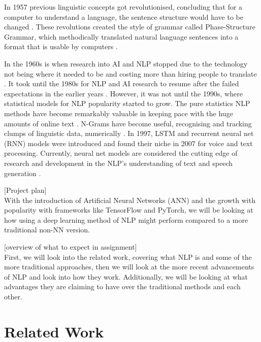 \documentclass[a4paper,10pt]{article}
\begin{document}
	In 1957 previous linguistic concepts got revolutionised, concluding that for a computer to understand a language, the sentence structure would have to be changed \cite{chomsky2002syntactic}. These revolutions created the style of grammar called Phase-Structure Grammar, which methodically translated natural language sentences into a format that is usable by computers \cite{nlp_history}. 
	
	In the 1960s is when research into AI and NLP stopped due to the technology not being where it needed to be and costing more than hiring people to translate \cite{nlp_history}. It took until the 1980s for NLP and AI \cite{what_ai} research to resume after the failed expectations in the earlier years \cite{nlp_history}. However, it was not until the 1990s, where statistical models for NLP popularity started to grow. The pure statistics NLP methods have become remarkably valuable in keeping pace with the huge amounts of online text \cite{nlp_history}. N-Grams have become useful, recognising and tracking clumps of linguistic data, numerically \cite{n_grams}. In 1997, LSTM and recurrent neural net (RNN) models \cite{nlp_rnn} were introduced and found their niche in 2007 for voice and text processing. Currently, neural net models are considered the cutting edge of research and development in the NLP's understanding of text and speech generation \cite{nlp_history}.
	
	
	
	[Project plan] \\With the introduction of Artificial Neural Networks (ANN) and the growth with popularity with frameworks like TensorFlow and PyTorch, we will be looking at how using a deep learning method of NLP might perform compared to a more traditional non-NN version.
	
	[overview of what to expect in assignment]\\
	First, we will look into the related work, covering what NLP is and some of the more traditional approaches, then we will look at the more recent advancements of NLP and look into how they work. Additionally, we will be looking at what advantages they are claiming to have over the traditional methods and each other.

\section{Related Work}
\label{sec:related_work}
\end{document}
